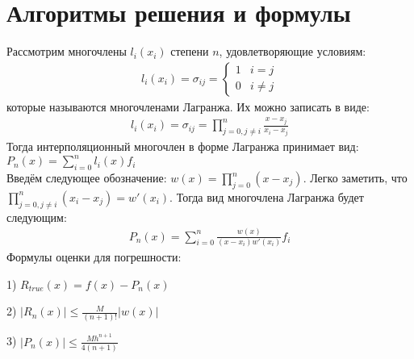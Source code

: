\documentclass[10pt]{scrartcl}
\begin{document}
\section*{Алгоритмы решения и формулы}\noindent
Рассмотрим многочлены $l_i(x_i)$ степени $n$, удовлетворяющие условиям:
\begin{gather*}
l_i(x_i) = \sigma_{ij} = 
\begin{cases}
   1 &\text{$i = j$}\\
   0 &\text{$i \neq j$}
 \end{cases}
\end{gather*}
которые называются многочленами Лагранжа. Их можно записать в виде:
\begin{gather*}
l_i(x_i) = \sigma_{ij} = \prod_{j=0, j\neq i}^{n}\frac{x - x_j}{x_i - x_j}
\end{gather*}
Тогда интерполяционный многочлен в форме Лагранжа принимает вид: $P_n(x) = \sum_{i = 0}^n l_i(x)f_i$\\
Введём следующее обозначение: $w(x) = \prod_{j=0}^n(x - x_j)$. Легко заметить, что $\prod_{j = 0, j \neq i}^n (x_i -
x_j) = w'(x_i)$. Тогда вид многочлена Лагранжа будет следующим:
\begin{gather*}
P_n(x) = \sum_{i = 0}^{n} \frac{w(x)}{(x - x_i)w'(x_i)}f_i
\end{gather*}
Формулы оценки для погрешности:

1) $R_{true}(x) = f(x) - P_n(x)$

2) $|R_n(x)| \leq \frac{M}{(n + 1)!}|w(x)|$

3) $|P_n(x)| \leq \frac{Mh^{n + 1}}{4(n + 1)}$
\end{document}
